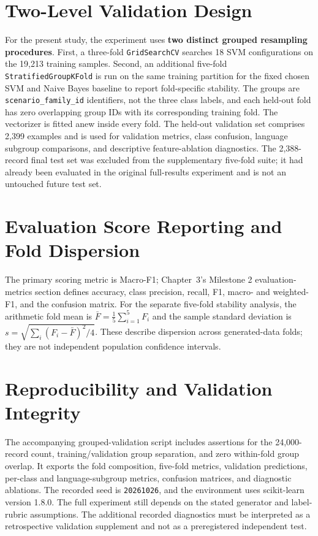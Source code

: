 \section{Two-Level Validation Design}
For the present study, the experiment uses \textbf{two distinct grouped resampling procedures}. First, a three-fold \texttt{GridSearchCV} searches 18 SVM configurations on the 19,213 training samples. Second, an additional five-fold \texttt{StratifiedGroupKFold} is run on the same training partition for the fixed chosen SVM and Naive Bayes baseline to report fold-specific stability. The groups are \texttt{scenario\_family\_id} identifiers, not the three class labels, and each held-out fold has zero overlapping group IDs with its corresponding training fold. The vectorizer is fitted anew inside every fold. The held-out validation set comprises 2,399 examples and is used for validation metrics, class confusion, language subgroup comparisons, and descriptive feature-ablation diagnostics. The 2,388-record final test set was excluded from the supplementary five-fold suite; it had already been evaluated in the original full-results experiment and is not an untouched future test set.

\section{Evaluation Score Reporting and Fold Dispersion}
The primary scoring metric is Macro-F1; Chapter~3's Milestone 2 evaluation-metrics section defines accuracy, class precision, recall, F1, macro- and weighted-F1, and the confusion matrix. For the separate five-fold stability analysis, the arithmetic fold mean is $\bar{F}=\frac15\sum_{i=1}^5F_i$ and the sample standard deviation is $s=\sqrt{\sum_i(F_i-\bar F)^2/4}$. These describe dispersion across generated-data folds; they are not independent population confidence intervals.\par

\section{Reproducibility and Validation Integrity}
The accompanying grouped-validation script includes assertions for the 24,000-record count, training/validation group separation, and zero within-fold group overlap. It exports the fold composition, five-fold metrics, validation predictions, per-class and language-subgroup metrics, confusion matrices, and diagnostic ablations. The recorded seed is \texttt{20261026}, and the environment uses scikit-learn version 1.8.0. The full experiment still depends on the stated generator and label-rubric assumptions. The additional recorded diagnostics must be interpreted as a retrospective validation supplement and not as a preregistered independent test.
